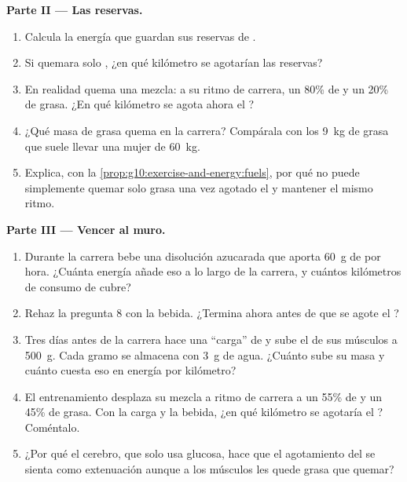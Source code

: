 \begin{problem}
\medskip
\noindent\textbf{Parte II --- Las reservas.}
\begin{enumerate}[resume]
  \item Calcula la energía que guardan sus reservas de .
  \item Si quemara solo , ¿en qué kilómetro se agotarían las
        reservas?
  \item En realidad quema una mezcla: a su ritmo de carrera, un 80\% de
         y un 20\% de grasa. ¿En qué kilómetro se agota ahora
        el ?
  \item ¿Qué masa de grasa quema en la carrera? Compárala con los
        \qty{9}{kg} de grasa que suele llevar una mujer de \qty{60}{kg}.
  \item Explica, con la \cref{prop:g10:exercise-and-energy:fuels}, por
        qué no puede simplemente quemar solo grasa una vez agotado el
         y mantener el mismo ritmo.
\end{enumerate}

\medskip
\noindent\textbf{Parte III --- Vencer al muro.}
\begin{enumerate}[resume]
  \item Durante la carrera bebe una disolución azucarada que aporta
        \qty{60}{g} de  por hora. ¿Cuánta energía añade eso a
        lo largo de la carrera, y cuántos kilómetros de consumo de
         cubre?
  \item Rehaz la pregunta 8 con la bebida. ¿Termina ahora antes de que
        se agote el ?
  \item Tres días antes de la carrera hace una ``carga'' de  y
        sube el  de sus músculos a \qty{500}{g}. Cada gramo se
        almacena con \qty{3}{g} de agua. ¿Cuánto sube su masa y cuánto
        cuesta eso en energía por kilómetro?
  \item El entrenamiento desplaza su mezcla a ritmo de carrera a un
        55\% de  y un 45\% de grasa. Con la carga y la bebida,
        ¿en qué kilómetro se agotaría el ? Coméntalo.
  \item ¿Por qué el cerebro, que solo usa glucosa, hace que el
        agotamiento del  se sienta como extenuación aunque a
        los músculos les quede grasa que quemar?
\end{enumerate}


\end{problem}
